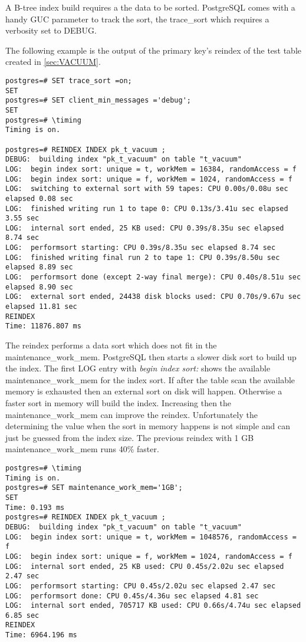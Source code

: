 A B-tree index build requires a the data to be sorted. PostgreSQL comes with a handy GUC parameter to track 
the sort, the trace\_sort which requires a verbosity set to DEBUG.

The following example is the output of the primary key's reindex of the test table created in 
\ref{sec:VACUUM}. 


\begin{lstlisting}[style=pgsql]
postgres=# SET trace_sort =on;
SET
postgres=# SET client_min_messages ='debug';
SET
postgres=# \timing
Timing is on.

postgres=# REINDEX INDEX pk_t_vacuum ;
DEBUG:  building index "pk_t_vacuum" on table "t_vacuum"
LOG:  begin index sort: unique = t, workMem = 16384, randomAccess = f
LOG:  begin index sort: unique = f, workMem = 1024, randomAccess = f
LOG:  switching to external sort with 59 tapes: CPU 0.00s/0.08u sec elapsed 0.08 sec
LOG:  finished writing run 1 to tape 0: CPU 0.13s/3.41u sec elapsed 3.55 sec
LOG:  internal sort ended, 25 KB used: CPU 0.39s/8.35u sec elapsed 8.74 sec
LOG:  performsort starting: CPU 0.39s/8.35u sec elapsed 8.74 sec
LOG:  finished writing final run 2 to tape 1: CPU 0.39s/8.50u sec elapsed 8.89 sec
LOG:  performsort done (except 2-way final merge): CPU 0.40s/8.51u sec elapsed 8.90 sec
LOG:  external sort ended, 24438 disk blocks used: CPU 0.70s/9.67u sec elapsed 11.81 sec
REINDEX
Time: 11876.807 ms

\end{lstlisting}

The reindex performs a data sort which does not fit in the maintenance\_work\_mem. PostgreSQL then 
starts a slower disk sort to build up the index. The first LOG entry with \textit{begin index 
sort:} shows the available maintenance\_work\_mem for the index sort. If after the table scan the 
available memory is exhausted then an external sort on disk will happen. Otherwise a faster sort in 
memory will build the index. Increasing then the maintenance\_work\_mem  can improve the reindex. 
Unfortunately the determining the value when the sort in memory happens is not simple and can just 
be guessed from the index size. The previous reindex with 1 GB maintenance\_work\_mem runs 40\% 
faster.

\begin{lstlisting}[style=pgsql]
postgres=# \timing
Timing is on.
postgres=# SET maintenance_work_mem='1GB';
SET
Time: 0.193 ms
postgres=# REINDEX INDEX pk_t_vacuum ;
DEBUG:  building index "pk_t_vacuum" on table "t_vacuum"
LOG:  begin index sort: unique = t, workMem = 1048576, randomAccess = f
LOG:  begin index sort: unique = f, workMem = 1024, randomAccess = f
LOG:  internal sort ended, 25 KB used: CPU 0.45s/2.02u sec elapsed 2.47 sec
LOG:  performsort starting: CPU 0.45s/2.02u sec elapsed 2.47 sec
LOG:  performsort done: CPU 0.45s/4.36u sec elapsed 4.81 sec
LOG:  internal sort ended, 705717 KB used: CPU 0.66s/4.74u sec elapsed 6.85 sec
REINDEX
Time: 6964.196 ms


\end{lstlisting}


